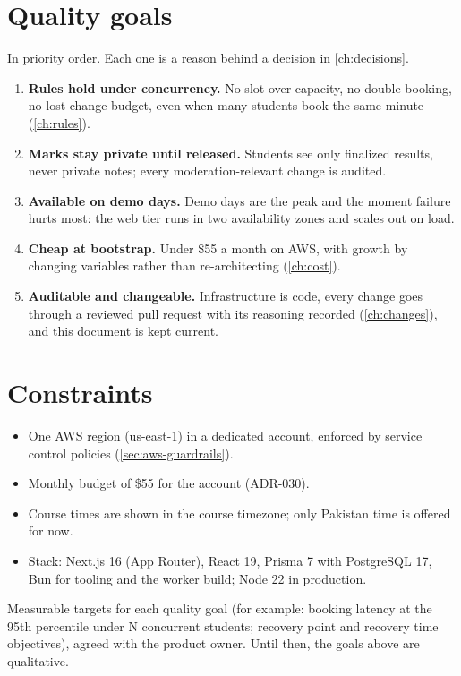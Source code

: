 \section{Quality goals}
In priority order. Each one is a reason behind a decision in \cref{ch:decisions}.
\begin{enumerate}
  \item \textbf{Rules hold under concurrency.} No slot over capacity, no double booking, no
    lost change budget, even when many students book the same minute (\cref{ch:rules}).
  \item \textbf{Marks stay private until released.} Students see only finalized results, never
    private notes; every moderation-relevant change is audited.
  \item \textbf{Available on demo days.} Demo days are the peak and the moment failure hurts
    most: the web tier runs in two availability zones and scales out on load.
  \item \textbf{Cheap at bootstrap.} Under \$55 a month on AWS, with growth by changing
    variables rather than re-architecting (\cref{ch:cost}).
  \item \textbf{Auditable and changeable.} Infrastructure is code, every change goes through a
    reviewed pull request with its reasoning recorded (\cref{ch:changes}), and this document is
    kept current.
\end{enumerate}

\section{Constraints}
\begin{itemize}
  \item One AWS region (us-east-1) in a dedicated account, enforced by service control policies (\cref{sec:aws-guardrails}).
  \item Monthly budget of \$55 for the account (ADR-030).
  \item Course times are shown in the course timezone; only Pakistan time is offered for now.
  \item Stack: Next.js 16 (App Router), React 19, Prisma 7 with PostgreSQL 17, Bun for tooling
    and the worker build; Node 22 in production.
\end{itemize}

\begin{todo}
  Measurable targets for each quality goal (for example: booking latency at the 95th percentile
  under N concurrent students; recovery point and recovery time objectives), agreed with the
  product owner. Until then, the goals above are qualitative.
\end{todo}
